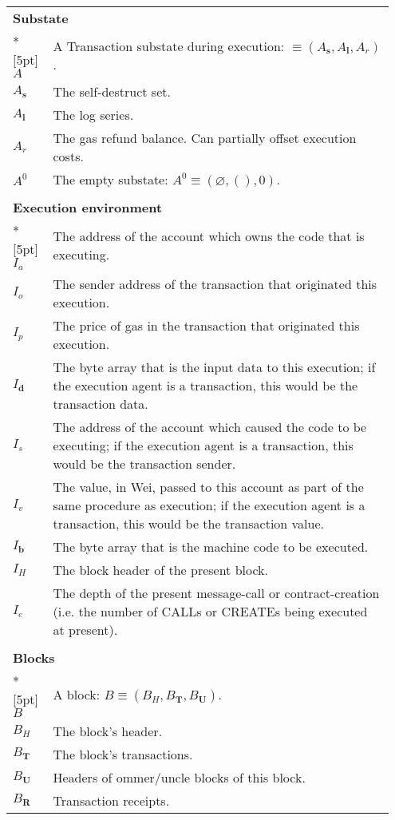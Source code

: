 \documentclass[9pt,oneside]{amsart}
\begin{document}
\begin{longtable}{p{0.10\linewidth}p{0.85\linewidth}}
\vspace{5pt} \\
\midrule
\multicolumn{2}{l}{\textbf{Substate}} \\*[5pt]
$A$ & A Transaction substate during execution: $\equiv (A_\mathbf{s},
A_\mathbf{l}, A_r)$. \\
$A_\mathbf{s}$ & The self-destruct set. \\
$A_\mathbf{l}$ & The log series. \\
$A_r$ & The gas refund balance. Can partially offset execution costs.\\
$A^0$ & The empty substate: $A^0 \equiv (\varnothing, (), 0)$. \\

\vspace{5pt} \\
\midrule
\multicolumn{2}{l}{\textbf{Execution environment}} \\*[5pt]
$I_a$ & The address of the account which owns the code that is executing. \\
$I_o$ & The sender address of the transaction that originated this execution. \\
$I_p$ & The price of gas in the transaction that originated this execution. \\
$I_\mathbf{d}$ & The byte array that is the input data to this execution; if the execution agent is a transaction, this would be the transaction data. \\
$I_s$ & The address of the account which caused the code to be executing; if the execution agent is a transaction, this would be the transaction sender. \\
$I_v$ & The value, in Wei, passed to this account as part of the same procedure as execution; if the execution agent is a transaction, this would be the transaction value. \\
$I_\mathbf{b}$ & The byte array that is the machine code to be executed. \\
$I_H$ & The block header of the present block. \\
$I_e$ & The depth of the present message-call or contract-creation (i.e. the number of {\small CALL}s or {\small CREATE}s being executed at present). \\

\vspace{5pt} \\
\midrule
\multicolumn{2}{l}{\textbf{Blocks}} \\*[5pt]
$B$ & A block: $B \equiv (B_H, B_\mathbf{T}, B_\mathbf{U}).$ \\
$B_H$ & The block's header. \\
$B_\mathbf{T}$ & The block's transactions. \\
$B_\mathbf{U}$ & Headers of ommer/uncle blocks of this block. \\
$B_\mathbf{R}$ & Transaction receipts. \\


\end{longtable}
\end{document}
